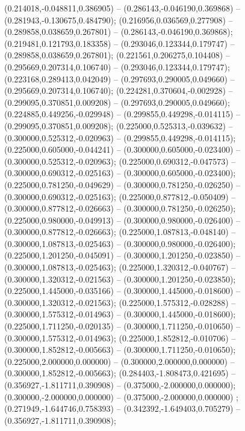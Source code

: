  (0.214018,-0.048811,0.386905) -- (0.286143,-0.046190,0.369868) -- (0.281943,-0.130675,0.484790);
 (0.216956,0.036569,0.277908) -- (0.289858,0.038659,0.267801) -- (0.286143,-0.046190,0.369868);
 (0.219481,0.121793,0.183358) -- (0.293046,0.123344,0.179747) -- (0.289858,0.038659,0.267801);
 (0.221561,0.206275,0.104408) -- (0.295669,0.207314,0.106740) -- (0.293046,0.123344,0.179747);
 (0.223168,0.289413,0.042049) -- (0.297693,0.290005,0.049660) -- (0.295669,0.207314,0.106740);
 (0.224281,0.370604,-0.002928) -- (0.299095,0.370851,0.009208) -- (0.297693,0.290005,0.049660);
 (0.224885,0.449256,-0.029948) -- (0.299855,0.449298,-0.014115) -- (0.299095,0.370851,0.009208);
 (0.225000,0.525313,-0.039632) -- (0.300000,0.525312,-0.020963) -- (0.299855,0.449298,-0.014115);
 (0.225000,0.605000,-0.044241) -- (0.300000,0.605000,-0.023400) -- (0.300000,0.525312,-0.020963);
 (0.225000,0.690312,-0.047573) -- (0.300000,0.690312,-0.025163) -- (0.300000,0.605000,-0.023400);
 (0.225000,0.781250,-0.049629) -- (0.300000,0.781250,-0.026250) -- (0.300000,0.690312,-0.025163);
 (0.225000,0.877812,-0.050409) -- (0.300000,0.877812,-0.026663) -- (0.300000,0.781250,-0.026250);
 (0.225000,0.980000,-0.049913) -- (0.300000,0.980000,-0.026400) -- (0.300000,0.877812,-0.026663);
 (0.225000,1.087813,-0.048140) -- (0.300000,1.087813,-0.025463) -- (0.300000,0.980000,-0.026400);
 (0.225000,1.201250,-0.045091) -- (0.300000,1.201250,-0.023850) -- (0.300000,1.087813,-0.025463);
 (0.225000,1.320312,-0.040767) -- (0.300000,1.320312,-0.021563) -- (0.300000,1.201250,-0.023850);
 (0.225000,1.445000,-0.035166) -- (0.300000,1.445000,-0.018600) -- (0.300000,1.320312,-0.021563);
 (0.225000,1.575312,-0.028288) -- (0.300000,1.575312,-0.014963) -- (0.300000,1.445000,-0.018600);
 (0.225000,1.711250,-0.020135) -- (0.300000,1.711250,-0.010650) -- (0.300000,1.575312,-0.014963);
 (0.225000,1.852812,-0.010706) -- (0.300000,1.852812,-0.005663) -- (0.300000,1.711250,-0.010650);
 (0.225000,2.000000,0.000000) -- (0.300000,2.000000,0.000000) -- (0.300000,1.852812,-0.005663);
 (0.284403,-1.808473,0.421695) -- (0.356927,-1.811711,0.390908) -- (0.375000,-2.000000,0.000000);
 (0.300000,-2.000000,0.000000) -- (0.375000,-2.000000,0.000000) ;
 (0.271949,-1.644746,0.758393) -- (0.342392,-1.649403,0.705279) -- (0.356927,-1.811711,0.390908);
